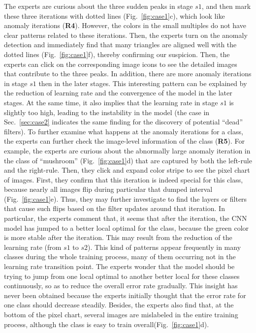 \documentclass[format=acmsmall, review=false, screen=true]{acmart}
\newcommand{\dy}{\textcolor[rgb]{0,0,0}}
\begin{document}
The experts are curious about the three sudden peaks in stage $s1$, and then mark these three iterations with dotted lines (Fig.~\ref{fig:case1}c), which look like anomaly iterations (\textbf{R4}).
However, the colors in the small multiples do not have clear patterns related to these iterations.
Then, the experts turn on the anomaly detection and immediately find that many triangles are aligned well with the dotted lines (Fig.~\ref{fig:case1}f), thereby confirming our suspicion.
Then, the experts can click on the corresponding image icons to see the detailed images that contribute to the three peaks.
In addition, there are more anomaly iterations in stage $s1$ then in the later stages.
This interesting pattern can be explained by the reduction of learning rate and the convergence of the model in the later stages. At the same time, it also implies that the learning rate in stage $s1$ is slightly too high, leading to the instability in the model (the case in Sec.~\ref{sec:case2} indicates the same finding for the discovery of potential ``dead'' filters).
To further examine what happens at the anomaly iterations for a class, the experts can further check the image-level information of the class (\textbf{R5}).
For example, the experts are curious about the abnormally large anomaly iteration in the class of ``mushroom'' (Fig.~\ref{fig:case1}d) that are captured by both the left-rule and the right-rule.
Then, they click and expand color stripe to see the pixel chart of images.
First, they confirm that this iteration is indeed special for this class, because nearly all images flip during particular that \dy{dumped interval} (Fig.~\ref{fig:case1}e).
Thus, they may further investigate to find the layers or filters that cause such flips based on the filter updates around that iteration.
\dy{In particular, the experts comment that, it seems that after the iteration, the CNN model has jumped to a better local optimal for the class, because the green color is more stable after the iteration.
This may result from the reduction of the learning rate (from $s1$ to $s2$).
This kind of patterns appear frequently in many classes during the whole training process, many of them occurring not in the learning rate transition point.
The experts wonder that the model should be trying to jump from one local optimal to another better local for these classes continuously, so as to reduce the overall error rate gradually.}
This insight has never been obtained because the experts initially thought that the error rate for one class should decrease steadily.
Besides, the experts also find that, at the bottom of the pixel chart, several images are mislabeled in the entire training process, although the class is easy to train overall(Fig.~\ref{fig:case1}d).
\end{document}
